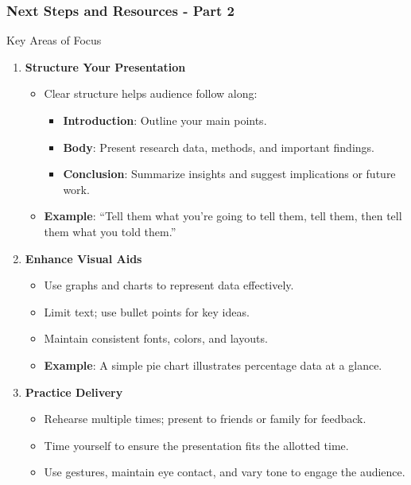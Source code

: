 \documentclass[aspectratio=169]{beamer}
\begin{document}
\begin{frame}[fragile]
    \frametitle{Next Steps and Resources - Part 2}
    \begin{block}{Key Areas of Focus}
        \begin{enumerate}
            \item \textbf{Structure Your Presentation}
                \begin{itemize}
                    \item Clear structure helps audience follow along:
                        \begin{itemize}
                            \item \textbf{Introduction}: Outline your main points.
                            \item \textbf{Body}: Present research data, methods, and important findings.
                            \item \textbf{Conclusion}: Summarize insights and suggest implications or future work.
                        \end{itemize}
                    \item \textbf{Example}: “Tell them what you’re going to tell them, tell them, then tell them what you told them.”
                \end{itemize}
            \item \textbf{Enhance Visual Aids}
                \begin{itemize}
                    \item Use graphs and charts to represent data effectively.
                    \item Limit text; use bullet points for key ideas.
                    \item Maintain consistent fonts, colors, and layouts.
                    \item \textbf{Example}: A simple pie chart illustrates percentage data at a glance.
                \end{itemize}
            \item \textbf{Practice Delivery}
                \begin{itemize}
                    \item Rehearse multiple times; present to friends or family for feedback.
                    \item Time yourself to ensure the presentation fits the allotted time.
                    \item Use gestures, maintain eye contact, and vary tone to engage the audience.

\end{itemize}
\end{enumerate}
\end{block}
\end{frame}
\end{document}
